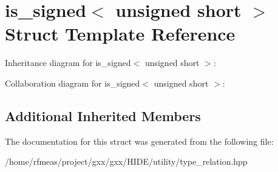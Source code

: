\hypertarget{structis__signed_3_01unsigned_01short_01_4}{}\section{is\+\_\+signed$<$ unsigned short $>$ Struct Template Reference}
\label{structis__signed_3_01unsigned_01short_01_4}


Inheritance diagram for is\+\_\+signed$<$ unsigned short $>$\+:


Collaboration diagram for is\+\_\+signed$<$ unsigned short $>$\+:
\subsection*{Additional Inherited Members}


The documentation for this struct was generated from the following file\+:\begin{DoxyCompactItemize}
\item 
/home/rfmeas/project/gxx/gxx/\+H\+I\+D\+E/utility/type\+\_\+relation.\+hpp\end{DoxyCompactItemize}
